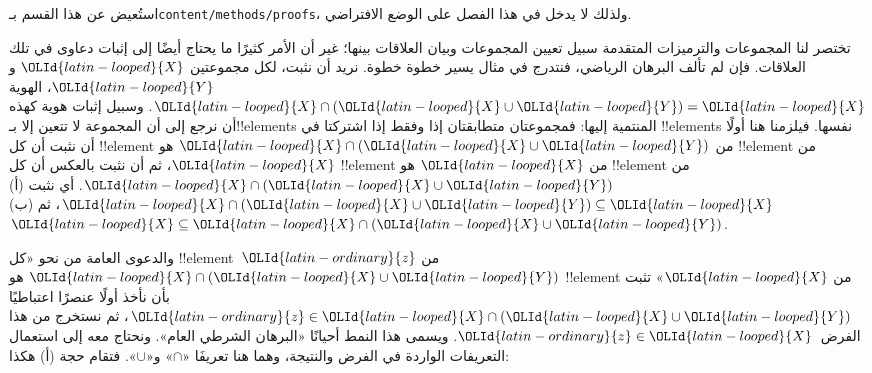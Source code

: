 \documentclass[../../../include/open-logic-section]{subfiles}
\begin{document}

\begin{editorial}
استُعيض عن هذا القسم بـ\verb|content/methods/proofs|، ولذلك لا يدخل في
هذا الفصل على الوضع الافتراضي.
\end{editorial}

\begin{explain}
تختصر لنا المجموعات والترميزات المتقدمة سبيل تعيين المجموعات وبيان
العلاقات بينها؛ غير أن الأمر كثيرًا ما يحتاج أيضًا إلى إثبات دعاوى في
تلك العلاقات. فإن لم تألف البرهان الرياضي، فنتدرج في مثال يسير خطوة
خطوة. نريد أن نثبت، لكل مجموعتين ${\OLId{latin-looped}{X}}$ و${\OLId{latin-looped}{Y}}$، الهوية
${\OLId{latin-looped}{X}} \cap ({\OLId{latin-looped}{X}} \cup {\OLId{latin-looped}{Y}}) = {\OLId{latin-looped}{X}}$. وسبيل إثبات هوية كهذه أن نرجع إلى أن المجموعة
لا تتعين إلا بـ!!{element}s المنتمية إليها: فمجموعتان متطابقتان إذا وفقط
إذا اشتركتا في !!{element}s نفسها. فيلزمنا هنا أولًا أن نثبت أن كل
!!{element} من ${\OLId{latin-looped}{X}} \cap ({\OLId{latin-looped}{X}} \cup {\OLId{latin-looped}{Y}})$ هو !!{element} من ${\OLId{latin-looped}{X}}$، ثم أن نثبت
بالعكس أن كل !!{element} من ${\OLId{latin-looped}{X}}$ هو !!{element} من
${\OLId{latin-looped}{X}} \cap ({\OLId{latin-looped}{X}} \cup {\OLId{latin-looped}{Y}})$. أي نثبت (أ)
${\OLId{latin-looped}{X}} \cap ({\OLId{latin-looped}{X}} \cup {\OLId{latin-looped}{Y}}) \subseteq {\OLId{latin-looped}{X}}$، ثم (ب) ${\OLId{latin-looped}{X}} \subseteq {\OLId{latin-looped}{X}} \cap ({\OLId{latin-looped}{X}} \cup {\OLId{latin-looped}{Y}})$.

والدعوى العامة من نحو «كل !!{element}~${\OLId{latin-ordinary}{z}}$ من ${\OLId{latin-looped}{X}} \cap ({\OLId{latin-looped}{X}}
\cup {\OLId{latin-looped}{Y}})$ هو !!{element} من ${\OLId{latin-looped}{X}}$» تثبت بأن نأخذ أولًا عنصرًا اعتباطيًا
${\OLId{latin-ordinary}{z}} \in {\OLId{latin-looped}{X}} \cap ({\OLId{latin-looped}{X}} \cup {\OLId{latin-looped}{Y}})$، ثم نستخرج من هذا الفرض~${\OLId{latin-ordinary}{z}} \in {\OLId{latin-looped}{X}}$. ويسمى
هذا النمط أحيانًا «البرهان الشرطي العام». ونحتاج معه إلى استعمال
التعريفات الواردة في الفرض والنتيجة، وهما هنا تعريفَا «$\cap$» و«$\cup$».
فتقام حجة (أ) هكذا:


\end{explain}
\end{document}
